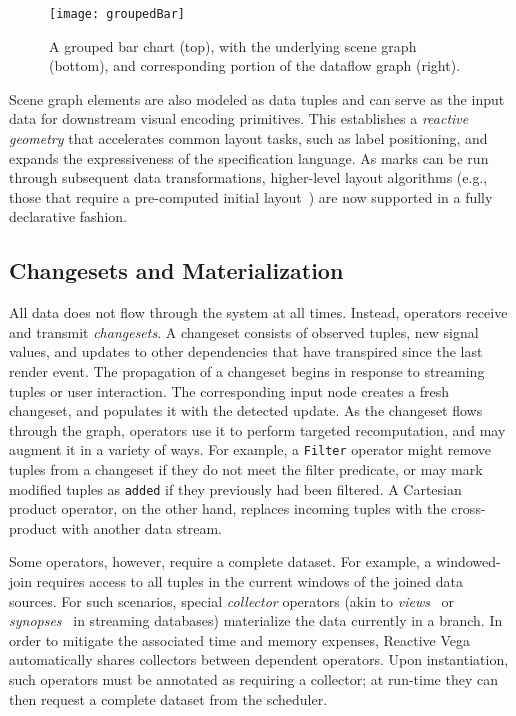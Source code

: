 \begin{figure}[t!]
  \centering
  \texttt{[image: groupedBar]}
  \caption{A grouped bar chart (top), with the underlying scene graph (bottom),
  and corresponding portion of the dataflow graph (right).}
  \label{fig:vg:groupedBar}
\end{figure}

Scene graph elements are also modeled as data tuples and can serve as the input
data for downstream visual encoding primitives. This establishes a
\emph{reactive geometry} that accelerates common layout tasks, such as label
positioning, and expands the expressiveness of the specification language. As
marks can be run through subsequent data transformations, higher-level layout
algorithms (e.g., those that require a pre-computed initial
layout~\cite{flexbox}) are now supported in a fully declarative fashion.

\subsection{Changesets and Materialization}

\vspace{-7pt}

All data does not flow through the system at all times. Instead, operators
receive and transmit \emph{changesets}. A changeset consists of observed tuples,
new signal values, and updates to other dependencies that have transpired since
the last render event. The propagation of a changeset begins in response to
streaming tuples or user interaction. The corresponding input node creates a
fresh changeset, and populates it with the detected update. As the changeset
flows through the graph, operators use it to perform targeted recomputation, and
may augment it in a variety of ways. For example, a \texttt{Filter} operator
might remove tuples from a changeset if they do not meet the filter predicate,
or may mark modified tuples as \texttt{added} if they previously had been
filtered. A Cartesian product operator, on the other hand, replaces incoming
tuples with the cross-product with another data stream.

Some operators, however, require a complete dataset. For example, a
windowed-join requires access to all tuples in the current windows of the joined
data sources. For such scenarios, special \emph{collector} operators (akin to
\emph{views}~\cite{abadi:aurora} or \emph{synopses}~\cite{arasu:stream} in
streaming databases) materialize the data currently in a branch. In order to
mitigate the associated time and memory expenses, Reactive Vega automatically
shares collectors between dependent operators. Upon instantiation, such
operators must be annotated as requiring a collector; at run-time they can then
request a complete dataset from the scheduler.

